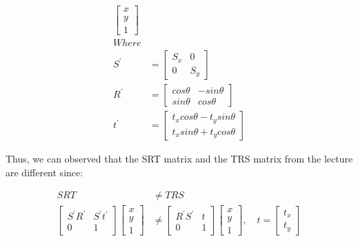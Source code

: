 \documentclass[11pt]{article}
\begin{document}
\begin{equation*}
\begin{split}
            \begin{bmatrix} x\\ y\\ 1 \end{bmatrix}
        \\
    Where \\
    S^{'} & = \begin{bmatrix} S_x &0 \\ 0 &S_y \end{bmatrix} \\
    R^{'} & = \begin{bmatrix} cos\theta &-sin\theta \\ sin\theta &cos\theta \end{bmatrix} \\
    t^{'} & = \begin{bmatrix} t_xcos\theta - t_ysin\theta \\ t_xsin\theta + t_ycos\theta \end{bmatrix} 
\end{split}
\end{equation*}

\begin{flushleft}
    Thus, we can observed that the SRT matrix and the TRS matrix from the lecture are different since:
\end{flushleft}   

\begin{equation*}
    \begin{split}
        SRT & \neq  TRS \\
        \begin{bmatrix} S^{'}R^{'} &S^{'}t^{'} \\ 0 &1 \end{bmatrix}
        \begin{bmatrix} x\\ y\\ 1 \end{bmatrix}
        & \neq
        \begin{bmatrix} R^{'}S^{'} & t \\ 0 &1 \end{bmatrix}
        \begin{bmatrix} x\\ y\\ 1 \end{bmatrix} , \quad
        t = \begin{bmatrix} t_x \\ t_y \end{bmatrix}
    \end{split}
    \end{equation*}
\end{document}
